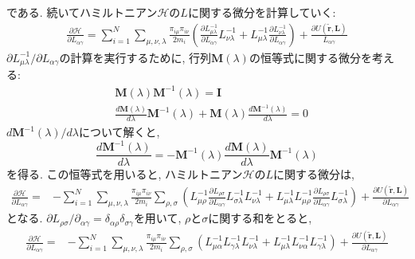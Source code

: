 である. 続いてハミルトニアン$\mathcal{H}$の$L$に関する微分を計算していく:
\begin{align}
  \frac{\partial \mathcal{H}}{\partial L_{\alpha\gamma}} =
  \sum_{i=1}^{N}
  \sum_{\mu,\nu,\lambda} \frac{\pi_{i\mu}\pi_{i\nu}}{2m_{i}}
  \left(
    \frac{\partial L_{\mu\lambda}^{-1}}{\partial L_{\alpha\gamma}} L_{\nu\lambda}^{-1} +
    L_{\mu\lambda}^{-1} \frac{\partial L_{\nu\lambda}^{-1}}{\partial L_{\alpha\gamma}}
  \right) +
  \frac{\partial U(\tilde{\bm{r}}, \bm{L})}{L_{\alpha\gamma}}
\end{align}
$\partial L_{\mu\lambda}^{-1}/\partial L_{\alpha\gamma}$の計算を実行するために, 行列$\bm{M}(\lambda)$の恒等式に関する微分を考える:
\begin{align}
  &\bm{M}(\lambda)\bm{M}^{-1}(\lambda) = \bm{I} \\
  &\frac{d\bm{M}(\lambda)}{d \lambda} \bm{M}^{-1}(\lambda) + \bm{M}(\lambda)\frac{d\bm{M}^{-1}(\lambda)}{d\lambda} = 0
\end{align}
$d\bm{M}^{-1}(\lambda)/d\lambda$について解くと, 
\begin{equation}
  \frac{d\bm{M}^{-1}(\lambda)}{d \lambda} = - \bm{M}^{-1}(\lambda)\frac{d\bm{M}(\lambda)}{d\lambda} \bm{M}^{-1}(\lambda)
\end{equation}
を得る. この恒等式を用いると, ハミルトニアン$\mathcal{H}$の$L$に関する微分は, 
\begin{align}
  \frac{\partial \mathcal{H}}{\partial L_{\alpha\gamma}} =&
  -\sum_{i=1}^{N}
  \sum_{\mu,\nu,\lambda} \frac{\pi_{i\mu}\pi_{i\nu}}{2m_{i}}
  \sum_{\rho,\sigma}
  \left(
    L_{\mu\rho}^{-1} \frac{\partial L_{\rho\sigma}}{\partial L_{\alpha\gamma}} L_{\sigma\lambda}^{-1} L_{\nu\lambda}^{-1} +
    L_{\mu\lambda}^{-1} L_{\mu\rho}^{-1} \frac{\partial L_{\rho\sigma}}{\partial L_{\alpha\gamma}} L_{\sigma\lambda}^{-1}
  \right) +
  \frac{\partial U(\tilde{\bm{r}}, \bm{L})}{\partial L_{\alpha\gamma}}
\end{align}
となる. $\partial L_{\rho\sigma}/\partial_{\alpha\gamma} = \delta_{\alpha\rho}\delta_{\sigma\gamma}$を用いて, $\rho$と$\sigma$に関する和をとると,
\begin{align}
  \frac{\partial \mathcal{H}}{\partial L_{\alpha\gamma}} =&
  -\sum_{i=1}^{N}
  \sum_{\mu,\nu,\lambda} \frac{\pi_{i\mu}\pi_{i\nu}}{2m_{i}}
  \sum_{\rho,\sigma}
  \left(
    L_{\mu\alpha}^{-1} L_{\gamma\lambda}^{-1} L_{\nu\lambda}^{-1} +
    L_{\mu\lambda}^{-1} L_{\nu\alpha}^{-1} L_{\gamma\lambda}^{-1}
  \right) +
  \frac{\partial U(\tilde{\bm{r}}, \bm{L})}{\partial L_{\alpha\gamma}}
\end{align}

